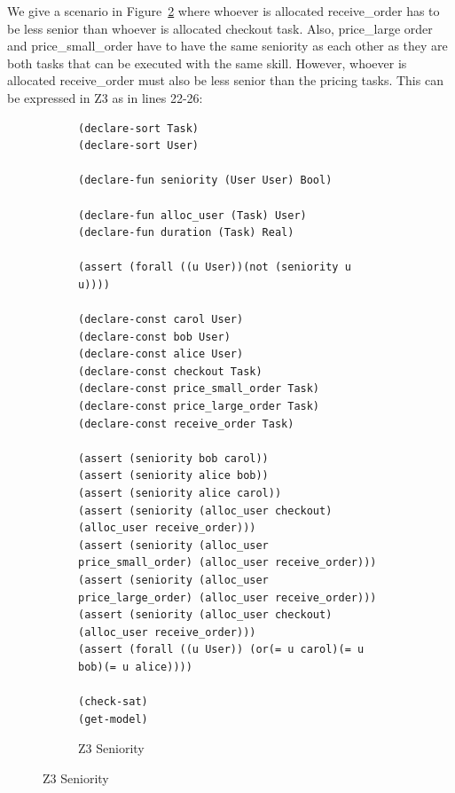 \documentclass[a4paper]{report}
\begin{document}
We give a scenario in Figure~\ref{fig:Z3 Seniority} where whoever is allocated receive\_order has to be less senior than whoever is allocated checkout task. Also, price\_large order and price\_small\_order have to have the same seniority as each other as they are both tasks that can be executed with the same skill. However, whoever is allocated receive\_order must also be less senior than the pricing tasks. This can be expressed in Z3 as in lines 22-26:
\begin{figure}[!h]
\begin{subfigure}{\textwidth}
\lstset{numbers=left, showspaces=false,
    showstringspaces=false, tabsize=2, breaklines=true,
    xleftmargin=5.0ex,
}
\begin{lstlisting}[frame=single]
(declare-sort Task) 
(declare-sort User) 

(declare-fun seniority (User User) Bool) 

(declare-fun alloc_user (Task) User) 
(declare-fun duration (Task) Real)

(assert (forall ((u User))(not (seniority u u))))

(declare-const carol User) 
(declare-const bob User) 
(declare-const alice User) 
(declare-const checkout Task)
(declare-const price_small_order Task)
(declare-const price_large_order Task)
(declare-const receive_order Task)

(assert (seniority bob carol)) 
(assert (seniority alice bob)) 
(assert (seniority alice carol))
(assert (seniority (alloc_user checkout) (alloc_user receive_order)))
(assert (seniority (alloc_user price_small_order) (alloc_user receive_order)))
(assert (seniority (alloc_user price_large_order) (alloc_user receive_order)))
(assert (seniority (alloc_user checkout) (alloc_user receive_order)))
(assert (forall ((u User)) (or(= u carol)(= u bob)(= u alice))))

(check-sat)
(get-model)
\end{lstlisting}
\caption{Z3 Seniority}
\label{fig:Z3 Seniority}
\end{subfigure}
\end{figure}
\clearpage
\end{document}
